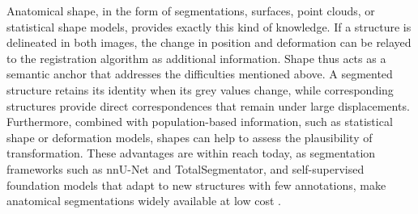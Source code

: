 
Anatomical shape, in the form of segmentations, surfaces, point clouds, or statistical shape models, provides exactly this kind of knowledge. If a structure is delineated in both images, the change in position and deformation can be relayed to the registration algorithm as additional information. Shape thus acts as a semantic anchor that addresses the difficulties mentioned above. A segmented structure retains its identity when its grey values change, while corresponding structures provide direct correspondences that remain under large displacements. Furthermore, combined with population-based information, such as statistical shape or deformation models, shapes can help to assess the plausibility of transformation. These advantages are within reach today, as segmentation frameworks such as nnU-Net and TotalSegmentator, and self-supervised foundation models that adapt to new structures with few annotations, make anatomical segmentations widely available at low cost \cite{isensee2021nnu,wasserthal2022totalsegmentator,xu2025generalizable}.



  
%
%
%


